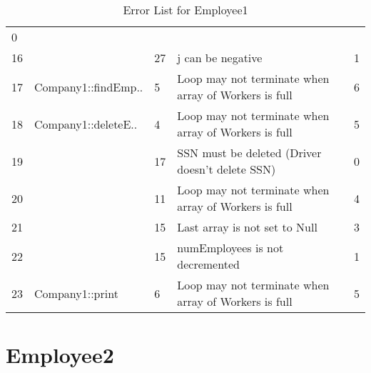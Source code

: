 \begin{table}[hb]
\begin{center}
\begin{tabular}{|l|l|l|l|l|}
0\\
16 &                       & 27 & j can be negative & 1\\
17 & Company1::findEmp.. & 5 & Loop may not terminate when array of Workers is
full & 6\\
18 & Company1::deleteE.. & 4 & Loop may not terminate when array of Workers
is full & 5\\
19 &                     & 17 & SSN must be deleted (Driver doesn't delete
SSN) & 0\\
20 &                     & 11 & Loop may not terminate when array of
Workers is full & 4\\
21 &                     & 15 & Last array is not set to Null & 3\\
22 &                     & 15 & numEmployees is not decremented & 1\\
23 & Company1::print     & 6 & Loop may not terminate when array of Workers
is full & 5\\
\hline
\end{tabular}
\caption{Error List for Employee1}
\end{center}
\end{table}

\section {Employee2}


